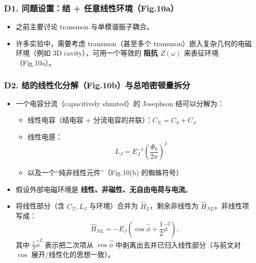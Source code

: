 \documentclass[12pt,a4paper,oneside]{ctexbook}
\providecommand{\tightlist}{%
  \setlength{\itemsep}{0pt}\setlength{\parskip}{0pt}}
\begin{document}
\subsubsection{\texorpdfstring{\textbf{D1. 问题设置：结 +
任意线性环境（Fig.10a）}}{D1. 问题设置：结 + 任意线性环境（Fig.10a）}}\label{d1.-ux95eeux9898ux8bbeux7f6eux7ed3-ux4efbux610fux7ebfux6027ux73afux5883fig.10a}

\begin{itemize}
\tightlist
\item
  之前主要讨论 transmon 与单模谐振子耦合。
\item
  许多实验中，需要考虑 transmon（甚至多个
  transmon）嵌入复杂几何的电磁环境（例如 3D cavity），可用一个等效的
  \textbf{阻抗 \(Z(\omega)\)} 来表征环境（Fig.10a）。
\end{itemize}

\subsubsection{\texorpdfstring{\textbf{D2.
结的线性化分解（Fig.10b）与总哈密顿量拆分}}{D2. 结的线性化分解（Fig.10b）与总哈密顿量拆分}}\label{d2.-ux7ed3ux7684ux7ebfux6027ux5316ux5206ux89e3fig.10bux4e0eux603bux54c8ux5bc6ux987fux91cfux62c6ux5206}

\begin{itemize}
\tightlist
\item
  一个电容分流（capacitively shunted）的 Josephson 结可以分解为：

  \begin{itemize}
  \tightlist
  \item
    线性电容（结电容 + 分流电容的并联）：\(C_\Sigma=C_S+C_J\)
  \item
    线性电感：\\
    \[
    L_J=E_J^{-1}\left(\frac{\Phi_0}{2\pi}\right)^2
    \]
  \item
    以及一个``纯非线性元件''（Fig.10(b) 的蜘蛛符号）
  \end{itemize}
\item
  假设外部电磁环境是 \textbf{线性、非磁性、无自由电荷与电流}。
\item
  将线性部分（含 \(C_\Sigma,L_J\) 与环境）合并为
  \(\hat H_L\)，剩余非线性为 \(\hat H_{NL}\)。非线性项写成： \[
  \hat H_{NL}=-E_J\left(\cos\hat\phi+\frac12\hat\phi^2\right),
  \tag{52}
  \] 其中 \(\frac12\hat\phi^2\) 表示把二次项从 \(\cos\hat\phi\)
  中剥离出去并已归入线性部分（与前文对 \(\cos\)
  展开/线性化的思想一致）。
\end{itemize}
\end{document}
